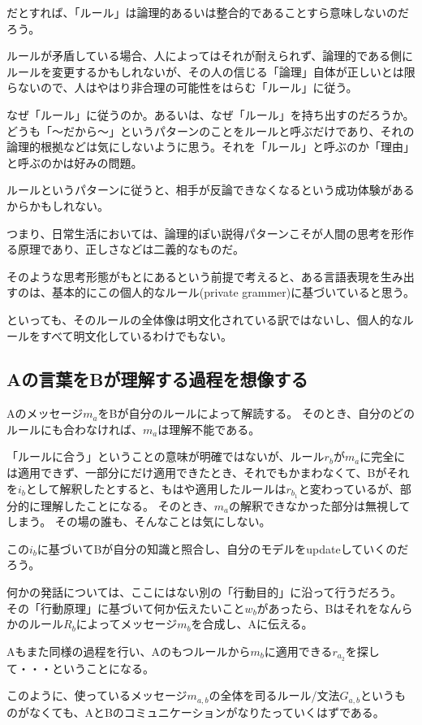 \documentclass[10pt, oneside]{jarticle}   	%
\begin{document}
だとすれば、「ルール」は論理的あるいは整合的であることすら意味しないのだろう。

ルールが矛盾している場合、人によってはそれが耐えられず、論理的である側にルールを変更するかもしれないが、その人の信じる「論理」自体が正しいとは限らないので、人はやはり非合理の可能性をはらむ「ルール」に従う。

なぜ「ルール」に従うのか。あるいは、なぜ「ルール」を持ち出すのだろうか。
どうも「〜だから〜」というパターンのことをルールと呼ぶだけであり、それの論理的根拠などは気にしないように思う。それを「ルール」と呼ぶのか「理由」と呼ぶのかは好みの問題。

ルールというパターンに従うと、相手が反論できなくなるという成功体験があるからかもしれない。

つまり、日常生活においては、論理的ぽい説得パターンこそが人間の思考を形作る原理であり、正しさなどは二義的なものだ。

そのような思考形態がもとにあるという前提で考えると、ある言語表現を生み出すのは、基本的にこの個人的なルール(private grammer)に基づいていると思う。

といっても、そのルールの全体像は明文化されている訳ではないし、個人的なルールをすべて明文化しているわけでもない。

\subsection{Aの言葉をBが理解する過程を想像する}

Aのメッセージ$m_a$をBが自分のルールによって解読する。
そのとき、自分のどのルールにも合わなければ、$m_a$は理解不能である。

「ルールに合う」ということの意味が明確ではないが、ルール$r_b$が$m_a$に完全には適用できず、一部分にだけ適用できたとき、それでもかまわなくて、Bがそれを$i_b$として解釈したとすると、もはや適用したルールは$r_{b_1}$と変わっているが、部分的に理解したことになる。
そのとき、$m_a$の解釈できなかった部分は無視してしまう。
その場の誰も、そんなことは気にしない。

この$i_b$に基づいてBが自分の知識と照合し、自分のモデルをupdateしていくのだろう。

何かの発話については、ここにはない別の「行動目的」に沿って行うだろう。
その「行動原理」に基づいて何か伝えたいこと$w_b$があったら、Bはそれをなんらかのルール$R_b$によってメッセージ$m_b$を合成し、Aに伝える。

Aもまた同様の過程を行い、Aのもつルールから$m_b$に適用できる$r_{a_2}$を探して・・・ということになる。

このように、使っているメッセージ$m_{a,b}$の全体を司るルール/文法$G_{a,b}$というものがなくても、AとBのコミュニケーションがなりたっていくはずである。
\end{document}
